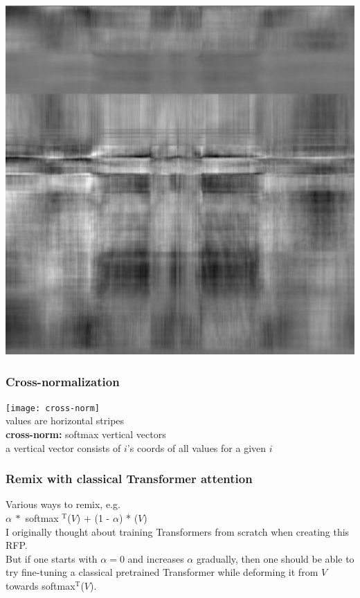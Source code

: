 \documentclass{beamer}
\newcommand{\msmagenta}[1]{{\color{mymagenta} #1}}
\begin{document}
\begin{frame}

\includegraphics[scale=0.5]{asymmetric}

\end{frame}

\begin{frame}

\frametitle{Cross-normalization}



\texttt{[image: cross-norm]}\\[2ex]

values are horizontal stripes\\[2ex]

{\bf cross-norm:} softmax vertical vectors\\[2ex]

a vertical vector consists of $i$'s coords of all values for a given $i$



\end{frame}

\begin{frame}

\frametitle{Remix with classical Transformer attention}

Various ways to remix, e.g.\\[4ex]


{\LARGE $\alpha\ *$ softmax\msmagenta{$^\text{T}$}($V$) + (1 - $\alpha$) * ($V$)}\\[4ex]


I originally thought about training Transformers from scratch when creating this RFP.\\[4ex]

But if one starts with $\alpha=0$ and increases $\alpha$ gradually, then one should be able
to try fine-tuning a classical pretrained Transformer while deforming it from $V$ towards \msmagenta{softmax$^\text{T}$}($V$).


\end{frame}
\end{document}
